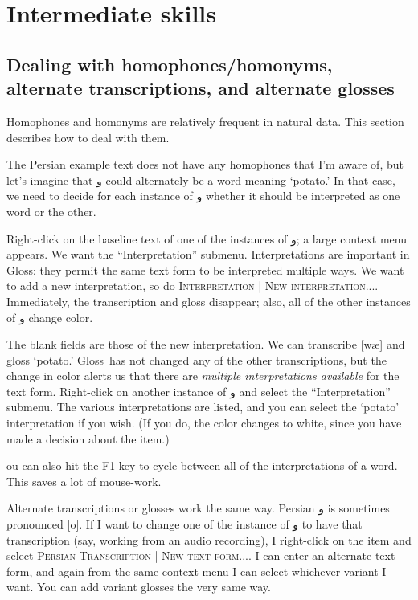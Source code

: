\documentclass[oneside]{book}
\def\menu#1{\textsc{#1}}
\def\menu#1#2{\textsc{#1 | #2}}
\def\gloss{\textsf{Gloss}}
\def\p#1{\textfarsi{#1}}
\def\tip#1\par{\medskip\noindent\fcolorbox{black}{light-gray}{\parbox{\textwidth}{#1}}\par\medskip}
\begin{document}
\chapter{Intermediate skills}

\section{Dealing with homophones/homonyms, alternate transcriptions, and alternate glosses}\label{sect:homophones}
Homophones and homonyms are relatively frequent in natural data. This section describes how to deal with them.

The Persian example text does not have any homophones that I'm aware of, but let's imagine that \p{و} could alternately be a word meaning `potato.' In that case, we need to decide for each instance of \p{و} whether it should be interpreted as one word or the other.

Right-click on the baseline text of one of the instances of \p{و}; a large context menu appears. We want the ``Interpretation'' submenu. Interpretations are important in \gloss: they permit the same text form to be interpreted multiple ways. We want to add a new interpretation, so do \menu{Interpretation}{New interpretation...}. Immediately, the transcription and gloss disappear; also, all of the other instances of \p{و} change color.

The blank fields are those of the new interpretation. We can transcribe [wæ] and gloss `potato.' \gloss\ has not changed any of the other transcriptions, but the change in color alerts us that there are \emph{multiple interpretations available} for the text form. Right-click on another instance of  \p{و} and select the ``Interpretation'' submenu. The various interpretations are listed, and you can select the `potato' interpretation if you wish. (If you do, the color changes to white, since you have made a decision about the item.)

\tip You can also hit the F1 key to cycle between all of the interpretations of a word. This saves a lot of mouse-work.

Alternate transcriptions or glosses work the same way. Persian \p{و} is sometimes pronounced [o]. If I want to change one of the instance of \p{و} to have that transcription (say, working from an audio recording), I right-click on the item and select \menu{Persian Transcription}{New text form...}. I can enter an alternate text form, and again from the same context menu I can select whichever variant I want. You can add variant glosses the very same way.
\end{document}
